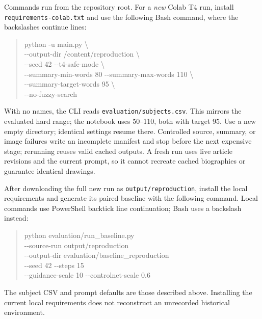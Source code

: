 Commands run from the repository root. For a \emph{new} Colab T4 run, install \nolinkurl{requirements-colab.txt} and use the following Bash command, where the backslashes continue lines:
\begin{quote}\small\raggedright
python -u main.py \textbackslash{}\\
\quad -{}-output-dir /content/reproduction \textbackslash{}\\
\quad -{}-seed 42 -{}-t4-safe-mode \textbackslash{}\\
\quad -{}-summary-min-words 80 -{}-summary-max-words 110 \textbackslash{}\\
\quad -{}-summary-target-words 95 \textbackslash{}\\
\quad -{}-no-fuzzy-search
\end{quote}
With no names, the CLI reads \nolinkurl{evaluation/subjects.csv}. This mirrors the evaluated hard range; the notebook uses 50--110, both with target 95. Use a new empty directory; identical settings resume there. Controlled source, summary, or image failures write an incomplete manifest and stop before the next expensive stage; rerunning reuses valid cached outputs. A fresh run uses live article revisions and the current prompt, so it cannot recreate cached biographies or guarantee identical drawings.

After downloading the full new run as \nolinkurl{output/reproduction}, install the local requirements and generate its paired baseline with the following command. Local commands use PowerShell backtick line continuation; Bash uses a backslash instead:
\begin{quote}\small\raggedright
python evaluation/run\_baseline.py \ShellContinue{}\\
\quad -{}-source-run output/reproduction \ShellContinue{}\\
\quad -{}-output-dir evaluation/baseline\_reproduction \ShellContinue{}\\
\quad -{}-seed 42 -{}-steps 15 \ShellContinue{}\\
\quad -{}-guidance-scale 10 -{}-controlnet-scale 0.6
\end{quote}
The subject CSV and prompt defaults are those described above. Installing the current local requirements does not reconstruct an unrecorded historical environment.

